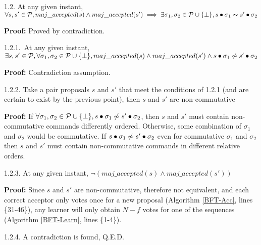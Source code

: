 \indent\indent\indent\parbox{\linewidth-\algorithmicindent*3}{\strut1.2. At any given instant, $\forall s,s' \in \mathcal{P}, maj\_accepted(s) \land maj\_accepted(s') \implies \exists \sigma_1,\sigma_2 \in \mathcal{P} \cup \{\bot\}, s \bullet \sigma_1 \thicksim s' \bullet \sigma_2$}\par
\indent\indent\indent\indent\parbox{\linewidth}{\strut\textbf{Proof:} Proved by contradiction.}\par
\indent\indent\indent\indent\indent\parbox{\linewidth-\algorithmicindent*5}{\strut1.2.1.~At any given instant, $\exists s,s' \in \mathcal{P}, \forall \sigma_1,\sigma_2 \in \mathcal{P} \cup \{\bot \}, maj\_accepted(s) \land maj\_accepted(s') \wedge s \bullet \sigma_1 \not\thicksim s' \bullet \sigma_2$} \par
\indent\indent\indent\indent\indent\indent\parbox{\linewidth}{\strut\textbf{Proof:} Contradiction assumption.}\par
\indent\indent\indent\indent\indent\parbox{\linewidth-\algorithmicindent*5}{\strut1.2.2. Take a pair proposals $s$ and $s'$ that meet the conditions of 1.2.1 (and are certain to exist by the previous point), then $s$ and $s'$ are non-commutative }\par
\indent\indent\indent\indent\indent\indent\parbox{\linewidth-\algorithmicindent*6}{\strut\textbf{Proof:} If $\forall \sigma_1,\sigma_2 \in \mathcal{P} \cup \{\bot\}, s \bullet \sigma_1 \not\thicksim s' \bullet \sigma_2$, then $s$ and $s'$ must contain non-commutative commands differently ordered. Otherwise, some combination of $\sigma_1$ and $\sigma_2$ would be commutative. If $s \bullet \sigma_1 \not\thicksim s' \bullet \sigma_2$ even for commutative $\sigma_1$ and $\sigma_2$ then $s$ and $s'$ must contain non-commutative commands in different relative orders.}\par
\indent\indent\indent\indent\indent\parbox{\linewidth}{\strut1.2.3. At any given instant, $\neg (maj\_accepted(s) \land maj\_accepted(s'))$ } \par
\indent\indent\indent\indent\indent\indent\parbox{\linewidth-\algorithmicindent*6}{\strut\textbf{Proof:} Since $s$ and $s'$ are non-commutative, therefore not equivalent, and each correct acceptor only votes once for a new proposal (Algorithm \ref{BFT-Acc}, lines \{31-46\}), any learner will only obtain $N-f$ votes for one of the sequences (Algorithm \ref{BFT-Learn}, lines \{1-4\}).}\par
\indent\indent\indent\indent\indent\parbox{\linewidth}{\strut1.2.4. A contradiction is found, Q.E.D. }\par
